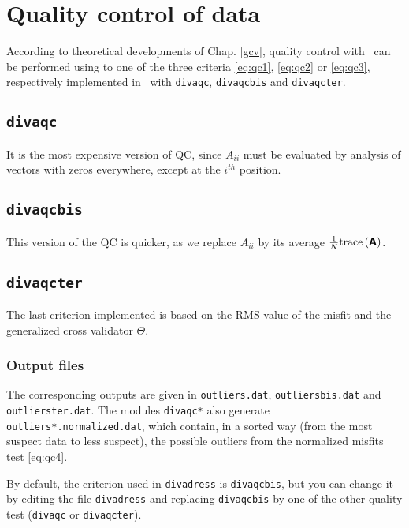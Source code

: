 \section{Quality control of data}

According to theoretical developments of Chap. \ref{gcv}, quality control with \diva\, can be performed using to one of the three criteria \eqref{eq:qc1}, \eqref{eq:qc2} or \eqref{eq:qc3}, respectively implemented in \diva\, with \texttt{diva\-qc}, \texttt{diva\-qc\-bis} and \texttt{diva\-qc\-ter}. 

\subsection{\texttt{divaqc}}

It is the most expensive version of QC, since $A_{ii}$ must be evaluated by analysis of vectors with zeros everywhere, except at the $i^{th}$ position.

\subsection{\texttt{divaqcbis}}

This version of the QC is quicker, as we replace $A_{ii}$ by its average $\frac{1}{N}\mathrm{trace}\left( \mbox{\boldmath $ \protect\mathsf{A} $} \right)$.

\subsection{\texttt{divaqcter}}

The last criterion implemented is based on the RMS value of the misfit and the generalized cross validator $\Theta$. 

\subsubsection{Output files}

The corresponding outputs are given in \texttt{out\-liers.dat}, \texttt{out\-liers\-bis.dat} and \texttt{out\-liers\-ter.dat}.
The modules \texttt{divaqc*} also generate \texttt{outliers*.normalized.dat}, which contain, in a sorted way (from the most suspect data to less suspect), the possible outliers from the normalized misfits test \eqref{eq:qc4}.

\btips
By default, the criterion used in \texttt{divadress} is \texttt{divaqcbis}, but you can change it by editing the file \texttt{divadress} and replacing \texttt{divaqcbis} by one of the other quality test (\texttt{divaqc} or \texttt{divaqcter}).
\etips


